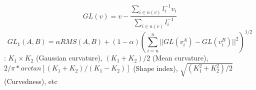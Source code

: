 \begin{equation}
GL(v)= v-\frac{\sum_{i \in n(v)}{l_i^{-1}v_i}}{\sum_{i \in n(v)}{l_i^{-1}}}
\end{equation}
\begin{equation}
GL_1(A,B)= \alpha RMS(A,B) + (1- \alpha)(\sum_{i=n}^n{||GL(v_i^A)-GL(v_i^B)||^2})^{1/2}
\end{equation}
: $ K_1 \times K_2$ (Gaussian curvature), $ (K_1+ K_2)/2$ (Mean curvature), $2/\pi *arctan[(K_1+ K_2)/( K_1- K_2)]$ (Shape index), $\sqrt{ (K_1^2+ K_2^2)/2}$ (Curvedness), etc